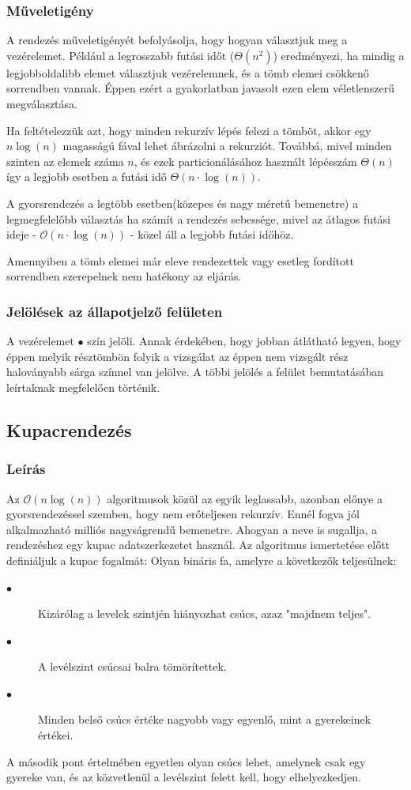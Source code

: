 \documentclass{elteikthesis}
\begin{document}
\subsubsection{Műveletigény}
A rendezés műveletigényét befolyásolja, hogy hogyan választjuk meg a vezérelemet. Például a legrosszabb futási időt ($\Theta(n^2)$) eredményezi, ha mindig a legjobboldalibb elemet választjuk vezérelemnek, és a tömb elemei csökkenő sorrendben vannak\cite{Cormen}. Éppen ezért a gyakorlatban javasolt ezen elem véletlenszerű megválasztása.\par
Ha feltételezzük azt, hogy minden rekurzív lépés felezi a tömböt, akkor egy $n\log(n)$ magasságú fával lehet ábrázolni a rekurziót. Továbbá, mivel minden szinten az elemek száma $n$, és ezek particionálásához használt lépésszám $\Theta(n)$ így a legjobb esetben a futási idő $\Theta(n\cdot\log(n))$.\par
 A gyorsrendezés a legtöbb esetben(közepes és nagy méretű bemenetre) a legmegfelelőbb választás ha számít a rendezés sebessége, mivel az átlagos futási ideje - $\mathcal{O}(n\cdot\log(n))$ - közel áll a legjobb futási időhöz\cite{Cormen}.\par
 Amennyiben a tömb elemei már eleve rendezettek vagy esetleg fordított sorrendben szerepelnek nem hatékony az eljárás.
\subsubsection{Jelölések az állapotjelző felületen}
A vezérelemet \textcolor{select}{\Huge$\bullet$} szín jelöli. Annak érdekében, hogy jobban átlátható legyen, hogy éppen melyik résztömbön folyik a vizsgálat az éppen nem vizsgált rész haloványabb sárga színnel van jelölve. A többi jelölés a felület bemutatásában leírtaknak megfelelően történik.

\subsection{Kupacrendezés}
\subsubsection{Leírás}
Az $\mathcal{O}(n\log (n))$ algoritmusok közül az egyik leglassabb, azonban előnye a gyorsrendezéssel szemben, hogy nem erőteljesen rekurzív. Ennél fogva jól alkalmazható milliós nagyságrendű bemenetre. Ahogyan a neve is sugallja, a rendezéshez egy kupac adatszerkezetet használ. Az algoritmus ismertetése előtt definiáljuk a kupac fogalmát\cite{Fekete}:
Olyan bináris fa, amelyre a következők teljesülnek:
\begin{description}
	\item[$\bullet$] Kizárólag a levelek szintjén hiányozhat csúcs, azaz "majdnem teljes".
	\item[$\bullet$] A levélszint csúcsai balra tömörítettek.
	\item[$\bullet$] Minden belső csúcs értéke nagyobb vagy egyenlő, mint a gyerekeinek értékei.
\end{description}
A második pont értelmében egyetlen olyan csúcs lehet, amelynek csak egy gyereke van, és az közvetlenül a levélszint felett kell, hogy elhelyezkedjen.\par
\end{document}
